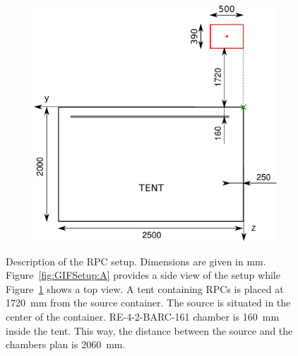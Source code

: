 \begin{figure}[!h]
\begin{subfigure}{0.5\linewidth}
				\includegraphics[width = 0.5\plotwidth]{fig/position-top.pdf}
				\caption{\label{fig:GIFSetup:B}}
			\end{subfigure}
			\caption{\label{fig:GIFSetup} Description of the RPC setup. Dimensions are given in \si{\mm}. Figure~\ref{fig:GIFSetup:A} provides a side view of the setup while Figure~\ref{fig:GIFSetup:B} shows a top view. A tent containing RPCs is placed at \SI{1720}{\mm} from the source container. The source is situated in the center of the container. RE-4-2-BARC-161 chamber is \SI{160}{\mm} inside the tent. This way, the distance between the source and the chambers plan is \SI{2060}{\mm}.}
		\end{figure}

